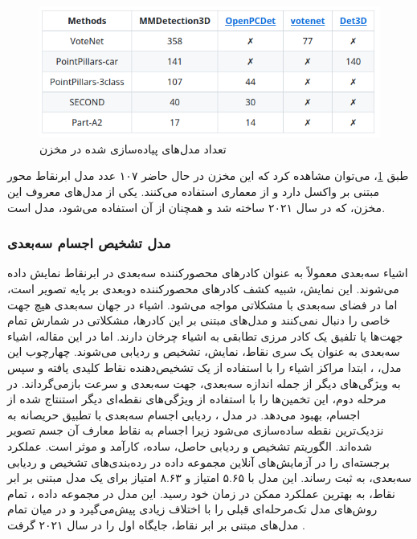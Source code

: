 \begin{figure}
    \centering
    \includegraphics[width=0.75\linewidth]{figures/MMDetection3D_Models.png}
    \caption{تعداد مدل‌های پیاده‌سازی شده در مخزن  \cite{mmdet3d2020}}
    \label{fig:MMDetection3D}
\end{figure}

طبق \cref{fig:MMDetection3D}، می‌توان مشاهده کرد که این مخزن در حال حاضر ۱۰۷ عدد مدل ابرنقاط محور مبتنی بر واکسل دارد و از معماری  استفاده می‌کنند. یکی از مدل‌های معروف این مخزن، که در سال ۲۰۲۱ ساخته شد و همچنان از آن استفاده می‌شود، مدل \cite{yin2021center} است.

\subsubsection{مدل تشخیص اجسام سه‌بعدی }
اشیاء سه‌بعدی معمولاً به عنوان کادرهای محصور‌کننده سه‌بعدی در ابرنقاط نمایش داده می‌شوند. این نمایش، شبیه کشف کادر‌های محصورکننده دوبعدی بر پایه تصویر است، اما در فضای سه‌بعدی با مشکلاتی مواجه می‌شود. اشیاء در جهان سه‌بعدی هیچ جهت خاصی را دنبال نمی‌کنند و  مدل‌های مبتنی بر این کادرها، مشکلاتی در شمارش تمام جهت‌ها یا تلفیق یک کادر مرزی تطابقی به اشیاء چرخان دارند. اما در این مقاله، اشیاء سه‌بعدی به عنوان یک سری نقاط، نمایش، تشخیص و ردیابی می‌شوند. چهارچوب این مدل، ، ابتدا مراکز اشیاء را با استفاده از یک تشخیص‌دهنده نقاط کلیدی یافته و سپس به ویژگی‌های دیگر از جمله اندازه سه‌بعدی، جهت سه‌بعدی و سرعت بازمی‌گرداند. در مرحله دوم، این تخمین‌ها را با استفاده از ویژگی‌های نقطه‌ای دیگر استنتاج شده از اجسام، بهبود می‌دهد. در مدل ، ردیابی اجسام سه‌بعدی با تطبیق حریصانه به نزدیک‌ترین نقطه ساده‌سازی می‌شود زیرا اجسام به نقاط معارف آن جسم تصویر شده‌اند. الگوریتم تشخیص و ردیابی حاصل، ساده، کارآمد و موثر است.  عملکرد برجسته‌ای را در آزمایش‌های آنلاین مجموعه داده  در رده‌بندی‌های تشخیص و ردیابی سه‌بعدی، به ثبت رساند. این مدل با ۵.۶۵ امتیاز  و ۸.۶۳ امتیاز  برای یک مدل مبتنی بر ابر نقاط، به بهترین عملکرد ممکن در زمان خود رسید. این مدل در مجموعه داده  ، تمام روش‌های مدل تک‌مرحله‌ای قبلی را با اختلاف زیادی پیش‌می‌گیرد و در میان تمام مدل‌های مبتنی بر ابر نقاط، جایگاه اول را در سال ۲۰۲۱ گرفت \cite{yin2021center}.


